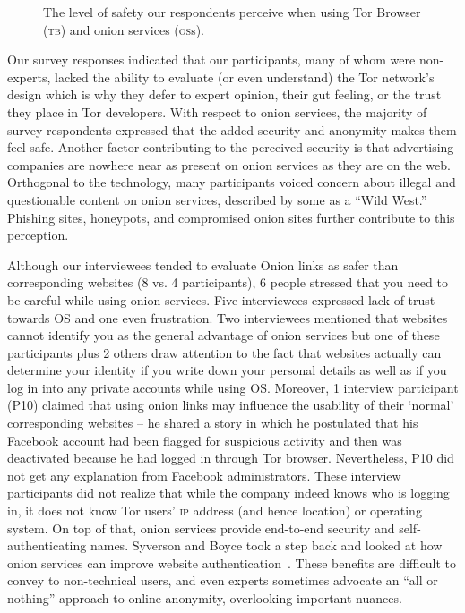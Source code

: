\begin{figure}[t]
    \centering
    
    \caption{The level of safety our respondents perceive when using Tor
    Browser (\textsc{tb}) and onion services (\textsc{os}s).}
    \label{fig:perceived-security}
\end{figure}

Our survey responses indicated that our participants, many of whom were non-experts,  lacked the ability to evaluate (or even understand) the
Tor network's design which is why they defer to expert opinion, their gut
feeling, or the trust they place in Tor developers.  With respect to onion
services, the majority of survey respondents expressed that the added security and anonymity makes
them feel safe.  Another factor contributing to the perceived security is that
advertising companies are nowhere near as present on onion services as they are
on the web.  Orthogonal to the technology, many participants voiced concern
about illegal and questionable content on onion services, described by some as a
``Wild West.'' Phishing sites, honeypots, and compromised onion sites further
contribute to this perception.

Although our interviewees tended to evaluate Onion links as safer than corresponding websites (8 vs. 4 participants), 6 people stressed that you need to be careful while using onion services. Five interviewees expressed lack of trust towards OS  and one even frustration.  Two interviewees mentioned that websites cannot identify you as the general advantage of onion services but one of these participants plus 2 others draw attention to the fact that websites actually can determine your identity if you write down your personal details as well as if you log in into any private accounts while using OS. Moreover, 1 interview participant (P10) claimed that using onion links may influence the usability of their ‘normal’ corresponding websites – he shared a story in which he postulated that his Facebook account had been flagged for suspicious activity and then was deactivated because he had logged in through Tor browser.  Nevertheless, P10 did not get any explanation from Facebook administrators. These interview participants did not realize that while the company indeed
knows who is logging in, it does not know Tor users' \textsc{ip} address (and
hence location) or operating system. On top of that, onion services provide
end-to-end security and self-authenticating names.  Syverson and Boyce took a
step back and looked at how onion services can improve website
authentication~\cite{Syverson2015a}.  These benefits are difficult to convey to
non-technical users, and even experts sometimes advocate an ``all or nothing''
approach to online anonymity, overlooking important nuances. 

